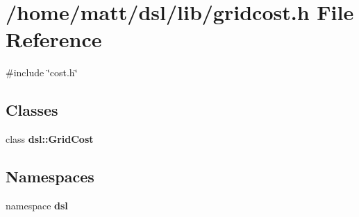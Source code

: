 \section{/home/matt/dsl/lib/gridcost.h \-File \-Reference}
\label{gridcost_8h}
{\ttfamily \#include \char`\"{}cost.\-h\char`\"{}}\*
\subsection*{\-Classes}
\begin{DoxyCompactItemize}
\item 
class {\bf dsl\-::\-Grid\-Cost}
\end{DoxyCompactItemize}
\subsection*{\-Namespaces}
\begin{DoxyCompactItemize}
\item 
namespace {\bf dsl}
\end{DoxyCompactItemize}
